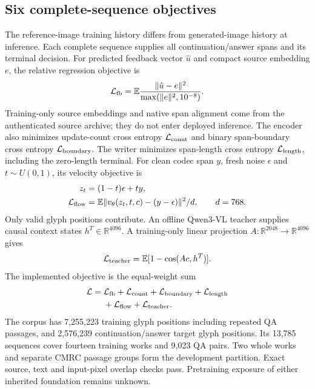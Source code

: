 \subsection*{Six complete-sequence objectives}
The reference-image training history differs from generated-image history at
inference. Each complete sequence supplies all continuation/answer spans and
its terminal decision. For predicted feedback vector $\hat u$ and compact
source embedding $e$, the relative regression objective is
\begin{equation}
 \mathcal L_{\rm fb}=\mathbb E
 \frac{\|\hat u-e\|^2}{\max(\|e\|^2,10^{-8})}.
\end{equation}
Training-only source embeddings and native span alignment come from the
authenticated source archive; they do not enter deployed inference. The
encoder also minimizes update-count cross entropy $\mathcal L_{\rm count}$
and binary span-boundary cross entropy $\mathcal L_{\rm boundary}$. The writer
minimizes span-length cross entropy $\mathcal L_{\rm length}$, including the
zero-length terminal. For clean codec span $y$, fresh noise $\epsilon$ and
$t\sim U(0,1)$, its velocity objective is
\begin{align}
 z_t&=(1-t)\epsilon+ty,\\
 \mathcal L_{\rm flow}&=\mathbb E\|v_\theta(z_t,t,c)-(y-\epsilon)\|^2/d,
 \qquad d=768.
\end{align}
Only valid glyph positions contribute. An offline Qwen3-VL teacher\cite{qwen3vl} supplies causal
context states $h^{T}\in\mathbb R^{4096}$. A training-only linear projection
$A:\mathbb R^{2048}\rightarrow\mathbb R^{4096}$ gives
\begin{equation}
 \mathcal L_{\rm teacher}=\mathbb E[1-\cos(Ac,h^{T})].
\end{equation}
The implemented objective is the equal-weight sum
\begin{align}
 \mathcal L={}&\mathcal L_{\rm fb}+\mathcal L_{\rm count}
 +\mathcal L_{\rm boundary}+\mathcal L_{\rm length}\nonumber\\
 &+\mathcal L_{\rm flow}+\mathcal L_{\rm teacher}.
\end{align}
The corpus has 7,255,223 training glyph positions including repeated QA
passages, and 2,576,239 continuation/answer target glyph positions. Its
13,785 sequences cover fourteen training works and 9,023 QA pairs. Two whole
works and separate CMRC passage groups form the development partition.
Exact source, text and input-pixel overlap checks pass. Pretraining exposure
of either inherited foundation remains unknown.

